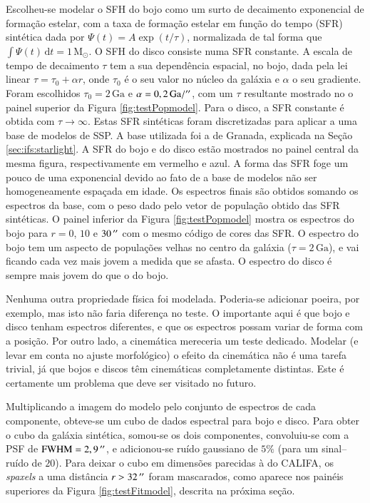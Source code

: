 Escolheu-se modelar o SFH do bojo como um surto de decaimento exponencial de
formação estelar, com a taxa de formação estelar em função do tempo (SFR)
sintética dada por $\Psi(t) = A \exp (t/\tau)$, normalizada de tal forma que
$\int \Psi(t)\,\mathrm{d}t = 1\,\mathrm{M}_\odot$. O SFH do disco consiste numa
SFR constante. A escala de tempo de decaimento $\tau$ tem a sua dependência
espacial, no bojo, dada pela lei linear $\tau = \tau_0 + \alpha r$, onde
$\tau_0$ é o seu valor no núcleo da galáxia e $\alpha$ o seu gradiente. Foram
escolhidos $\tau_0 = 2\,\mathrm{Ga}$ e $\alpha = 0,2\,\mathrm{Ga} / ^{\prime\prime}$, com
um $\tau$ resultante mostrado no o painel superior da Figura
\ref{fig:testPopmodel}. Para o disco, a SFR constante é obtida com
$\tau\to\infty$. Estas SFR sintéticas foram discretizadas para aplicar a uma
base de modelos de SSP. A base utilizada foi a de Granada, explicada na Seção
\ref{sec:ifs:starlight}. A SFR do bojo e do disco estão mostrados no painel
central da mesma figura, respectivamente em vermelho e azul. A forma das SFR
foge um pouco de uma exponencial devido ao fato de a base de modelos não ser
homogeneamente espaçada em idade. Os espectros finais são obtidos somando os
espectros da base, com o peso dado pelo vetor de população obtido das SFR
sintéticas. O painel inferior da Figura \ref{fig:testPopmodel} mostra os
espectros do bojo para $r = 0$, $10$ e $30\,^{\prime\prime}$ com o mesmo código de cores
das SFR. O espectro do bojo tem um aspecto de populações velhas no centro da
galáxia ($\tau = 2\,\mathrm{Ga}$), e vai ficando cada vez mais jovem a medida
que se afasta. O espectro do disco é sempre mais jovem do que o do bojo.

Nenhuma outra propriedade física foi modelada. Poderia-se adicionar poeira, por
exemplo, mas isto não faria diferença no teste. O importante aqui é que bojo e
disco tenham espectros diferentes, e que os espectros possam variar de forma com
a posição. Por outro lado, a cinemática mereceria um teste dedicado. Modelar (e
levar em conta no ajuste morfológico) o efeito da cinemática não é uma tarefa
trivial, já que bojos e discos têm cinemáticas completamente distintas. Este é
certamente um problema que deve ser visitado no futuro.

Multiplicando a imagem do modelo pelo conjunto de espectros de cada componente,
obteve-se um cubo de dados espectral para bojo e disco. Para obter o cubo da
galáxia sintética, somou-se os dois componentes, convoluiu-se com a PSF de
$\mathrm{FWHM} = 2,9\,^{\prime\prime}$, e adicionou-se ruído gaussiano de $5\%$ (para um
sinal--ruído de $20$). Para deixar o cubo em dimensões parecidas à do CALIFA, os
{\em spaxels} a uma distância $r > 32\,^{\prime\prime}$ foram mascarados, como aparece nos
painéis superiores da Figura \ref{fig:testFitmodel}, descrita na próxima seção.

